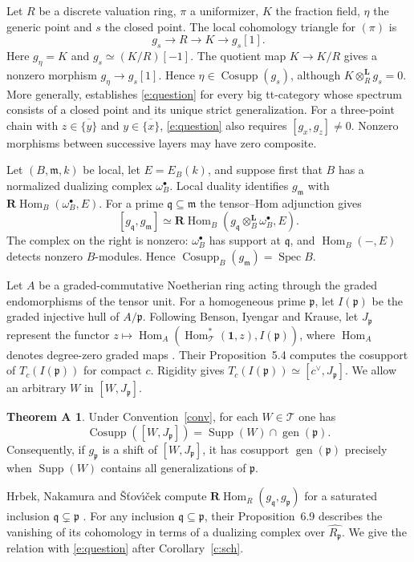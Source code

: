 \documentclass[11pt,reqno]{amsart}
\theoremstyle{definition}
\newtheorem*{mainA}{Theorem A}
\DeclareMathOperator{\Cosupp}{Cosupp}
\DeclareMathOperator{\Supp}{Supp}
\DeclareMathOperator{\gen}{gen}
\DeclareMathOperator{\Spec}{Spec}
\DeclareMathOperator{\Hom}{Hom}
\newcommand{\T}{\mathcal T}
\newcommand{\one}{\mathbf 1}
\newcommand{\p}{\mathfrak p}
\newcommand{\q}{\mathfrak q}
\newcommand{\m}{\mathfrak m}
\newcommand{\RHom}{\mathbf R\!\operatorname{Hom}}
\numberwithin{equation}{section}
\begin{document}
Let $R$ be a discrete valuation ring, $\pi$ a uniformizer, $K$ the fraction field, $\eta$ the generic point and $s$ the closed point. The local cohomology triangle for $(\pi)$ is
\[
 g_s\longrightarrow R\longrightarrow K\longrightarrow g_s[1].
\]
Here $g_\eta=K$ and $g_s\simeq(K/R)[-1]$. The quotient map $K\to K/R$ gives a nonzero morphism $g_\eta\to g_s[1]$. Hence $\eta\in\Cosupp(g_s)$, although $K\otimes_R^{\mathbf L}g_s=0$. More generally, \cite[Example~8.16]{bchs} establishes \eqref{e:question} for every big tt-category whose spectrum consists of a closed point and its unique strict generalization. For a three-point chain with $z\in\overline{\{y\}}$ and $y\in\overline{\{x\}}$, \eqref{e:question} also requires $[g_x,g_z]\ne0$. Nonzero morphisms between successive layers may have zero composite.

Let $(B,\m,k)$ be local, let $E=E_B(k)$, and suppose first that $B$ has a normalized dualizing complex $\omega_B^\bullet$. Local duality identifies $g_{\m}$ with $\RHom_B(\omega_B^\bullet,E)$. For a prime $\q\subseteq\m$ the tensor--Hom adjunction gives
\[
 [g_{\q},g_{\m}]
 \simeq\RHom_B(g_{\q}\otimes_B^{\mathbf L}\omega_B^\bullet,E).
\]
The complex on the right is nonzero: $\omega_B^\bullet$ has support at $\q$, and $\Hom_B(-,E)$ detects nonzero $B$-modules. Hence $\Cosupp_B(g_{\m})=\Spec B$.

Let $A$ be a graded-commutative Noetherian ring acting through the graded endomorphisms of the tensor unit. For a homogeneous prime $\p$, let $I(\p)$ be the graded injective hull of $A/\p$. Following Benson, Iyengar and Krause, let $J_{\p}$ represent the functor $z\mapsto\Hom_A(\Hom^*_{\T}(\one,z),I(\p))$, where $\Hom_A$ denotes degree-zero graded maps \cite[(5.3)]{bik}. Their Proposition~5.4 computes the cosupport of $T_c(I(\p))$ for compact $c$. Rigidity gives $T_c(I(\p))\simeq[c^\vee,J_{\p}]$. We allow an arbitrary $W$ in $[W,J_{\p}]$.

\begin{mainA} Under Convention~\ref{conv}, for each $W\in\T$ one has
\[
 \Cosupp([W,J_{\p}])=\Supp(W)\cap\gen(\p).
\]
Consequently, if $g_{\p}$ is a shift of $[W,J_{\p}]$, it has cosupport $\gen(\p)$ precisely when $\Supp(W)$ contains all generalizations of $\p$.
\end{mainA}

Hrbek, Nakamura and \v{S}\v{t}ov\'{\i}\v{c}ek compute $\RHom_R(g_{\q},g_{\p})$ for a saturated inclusion $\q\subsetneq\p$ \cite[Theorem~6.1]{hns}. For any inclusion $\q\subseteq\p$, their Proposition~6.9 describes the vanishing of its cohomology in terms of a dualizing complex over $\widehat{R_{\p}}$. We give the relation with \eqref{e:question} after Corollary~\ref{c:sch}.
\end{document}
